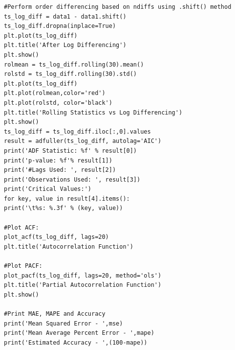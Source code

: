 \documentclass[BTech]{srmuthesis}
\begin{document}
\begin{lstlisting}
#Perform order differencing based on ndiffs using .shift() method
ts_log_diff = data1 - data1.shift()
ts_log_diff.dropna(inplace=True)
plt.plot(ts_log_diff)
plt.title('After Log Differencing')
plt.show()
rolmean = ts_log_diff.rolling(30).mean()
rolstd = ts_log_diff.rolling(30).std()
plt.plot(ts_log_diff)
plt.plot(rolmean,color='red')
plt.plot(rolstd, color='black')
plt.title('Rolling Statistics vs Log Differencing')
plt.show()
ts_log_diff = ts_log_diff.iloc[:,0].values
result = adfuller(ts_log_diff, autolag='AIC')
print('ADF Statistic: %f' % result[0])
print('p-value: %f'% result[1])
print('#Lags Used: ', result[2])
print('Observations Used: ', result[3])
print('Critical Values:')
for key, value in result[4].items():
print('\t%s: %.3f' % (key, value))

#Plot ACF:
plot_acf(ts_log_diff, lags=20)
plt.title('Autocorrelation Function')

#Plot PACF:
plot_pacf(ts_log_diff, lags=20, method='ols')
plt.title('Partial Autocorrelation Function')
plt.show()

#Print MAE, MAPE and Accuracy
print('Mean Squared Error - ',mse)
print('Mean Average Percent Error - ',mape)
print('Estimated Accuracy - ',(100-mape))
\end{lstlisting}
\pagebreak


\end{document}
